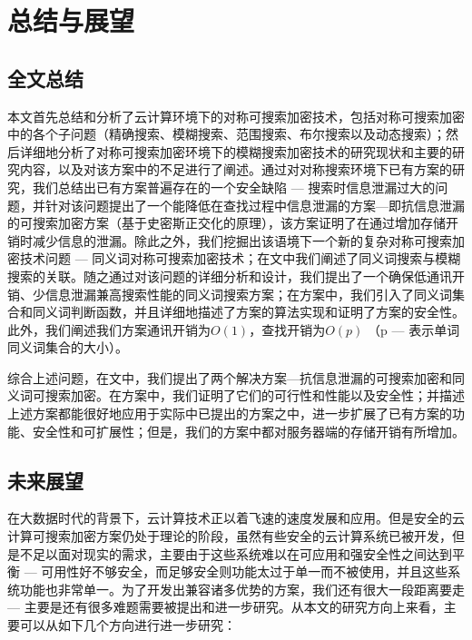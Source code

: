 
\chapter{总结与展望}
\label{chap:summary}

\section{全文总结}
\label{summary_summary}

本文首先总结和分析了云计算环境下的对称可搜索加密技术，包括对称可搜索加密中的各个子问题（精确搜索、模糊搜索、范围搜索、布尔搜索以及动态搜索）；然后详细地分析了对称可搜索加密环境下的模糊搜索加密技术的研究现状和主要的研究内容，以及对该方案中的不足进行了阐述。通过对对称搜索环境下已有方案的研究，我们总结出已有方案普遍存在的一个安全缺陷 --- 搜索时信息泄漏过大的问题，并针对该问题提出了一个能降低在查找过程中信息泄漏的方案---即抗信息泄漏的可搜索加密方案（基于史密斯正交化的原理），该方案证明了在通过增加存储开销时减少信息的泄漏。除此之外，我们挖掘出该语境下一个新的复杂对称可搜索加密技术问题 --- 同义词对称可搜索加密技术；在文中我们阐述了同义词搜索与模糊搜索的关联。随之通过对该问题的详细分析和设计，我们提出了一个确保低通讯开销、少信息泄漏兼高搜索性能的同义词搜索方案；在方案中，我们引入了同义词集合和同义词判断函数，并且详细地描述了方案的算法实现和证明了方案的安全性。此外，我们阐述我们方案通讯开销为$O(1)$，查找开销为$O(p)$ （p --- 表示单词同义词集合的大小）。

综合上述问题，在文中，我们提出了两个解决方案---抗信息泄漏的可搜索加密和同义词可搜索加密。在方案中，我们证明了它们的可行性和性能以及安全性；并描述上述方案都能很好地应用于实际中已提出的方案之中，进一步扩展了已有方案的功能、安全性和可扩展性；但是，我们的方案中都对服务器端的存储开销有所增加。



\section{未来展望}
\label{summary_fulture}

在大数据时代的背景下，云计算技术正以着飞速的速度发展和应用。但是安全的云计算可搜索加密方案仍处于理论的阶段，虽然有些安全的云计算系统已被开发，但是不足以面对现实的需求，主要由于这些系统难以在可应用和强安全性之间达到平衡 --- 可用性好不够安全，而足够安全则功能太过于单一而不被使用，并且这些系统功能也非常单一。为了开发出兼容诸多优势的方案，我们还有很大一段距离要走 --- 主要是还有很多难题需要被提出和进一步研究。从本文的研究方向上来看，主要可以从如下几个方向进行进一步研究：

